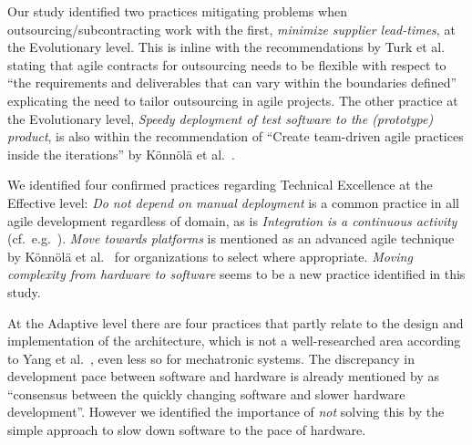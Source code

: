 \documentclass[10pt,a4paper]{IEEEtran} %
\begin{document}
Our study identified two practices mitigating problems when outsourcing/subcontracting work with the first, \emph{minimize supplier lead-times}, at the Evolutionary level.
This is inline with the recommendations by Turk et
al.~\cite{turk_limitations_2002} stating that agile contracts for outsourcing needs to be flexible with respect to ``the requirements and deliverables that can vary within the boundaries defined'' explicating the need to tailor outsourcing in agile projects.
The other practice at the Evolutionary level, \emph{Speedy deployment of test software to the (prototype) product}, is also within the recommendation of ``Create team-driven agile practices inside the iterations'' by Könnölä et al.~\cite{konnola_agile_2016}.

We identified four confirmed practices regarding Technical Excellence at the Effective level: \emph{Do not depend on manual deployment} is a common practice in all agile development regardless of domain, as is \emph{Integration is a continuous activity}
(cf.~e.g.~\cite{stojanov_maturity_2015, stahl_modeling_2014}). 
\emph{Move towards platforms} is mentioned as an advanced agile technique by Könnölä et al.~\cite{konnola_agile_2016} for organizations to select where appropriate. \emph{Moving complexity from hardware to software} seems to be a new practice identified in this study. 

At the Adaptive level there are four practices that partly relate to the design and implementation of the architecture, which is not a well-researched area according to Yang et al.~\cite{yang_systematic_2016}, even less so for mechatronic systems.
The discrepancy in development pace between software and hardware
is already mentioned by \cite{konnola_agile_2016} as ``consensus between the quickly changing software and slower hardware development''. However we identified the importance of \emph{not} solving this by the simple approach to slow down software to the pace of hardware.
\end{document}
